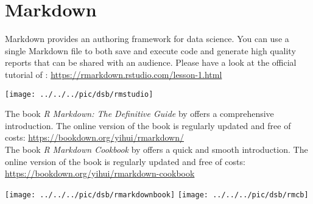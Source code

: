 \chapter{\R Markdown}


\R Markdown provides an authoring framework for data science. You can use a single \R Markdown file to both
save and execute code and
generate high quality reports that can be shared with an audience.
Please have a look at the official tutorial of \Rstudio:
\url{https://rmarkdown.rstudio.com/lesson-1.html}
	\begin{center}
		\texttt{[image: ../../../pic/dsb/rmstudio]}
	\end{center}

\begin{minipage}{0.4\textwidth}
	The book  \textit{R Markdown: The Definitive Guide} by \cite{Xie2018R} offers a comprehensive introduction. The online version of the book is regularly updated and free of costs: \url{https://bookdown.org/yihui/rmarkdown/}\\
	
	The book  \textit{R Markdown Cookbook} by \cite{Xie2020R} offers a quick and smooth introduction. The online version of the book is regularly updated and free of costs:  \url{https://bookdown.org/yihui/rmarkdown-cookbook}
\end{minipage}
\begin{minipage}{0.6\textwidth}
	\begin{center}
		\texttt{[image: ../../../pic/dsb/rmarkdownbook]}
		\texttt{[image: ../../../pic/dsb/rmcb]}
	\end{center}
\end{minipage}






